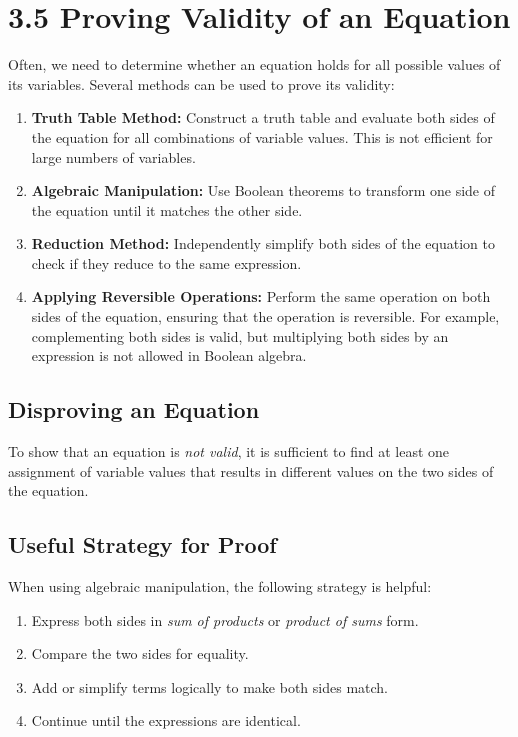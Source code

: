 \section*{3.5 Proving Validity of an Equation}

Often, we need to determine whether an equation holds for all possible values of its variables. Several methods can be used to prove its validity:

\begin{enumerate}
    \item \textbf{Truth Table Method:} Construct a truth table and evaluate both sides of the equation for all combinations of variable values. This is not efficient for large numbers of variables.
    \item \textbf{Algebraic Manipulation:} Use Boolean theorems to transform one side of the equation until it matches the other side.
    \item \textbf{Reduction Method:} Independently simplify both sides of the equation to check if they reduce to the same expression.
    \item \textbf{Applying Reversible Operations:} Perform the same operation on both sides of the equation, ensuring that the operation is reversible. For example, complementing both sides is valid, but multiplying both sides by an expression is not allowed in Boolean algebra.
\end{enumerate}

\subsection{Disproving an Equation}
To show that an equation is \textit{not valid}, it is sufficient to find at least one assignment of variable values that results in different values on the two sides of the equation.

\subsection{Useful Strategy for Proof}
When using algebraic manipulation, the following strategy is helpful:

\begin{enumerate}
    \item Express both sides in \textit{sum of products} or \textit{product of sums} form.
    \item Compare the two sides for equality.
    \item Add or simplify terms logically to make both sides match.
    \item Continue until the expressions are identical.
\end{enumerate}

